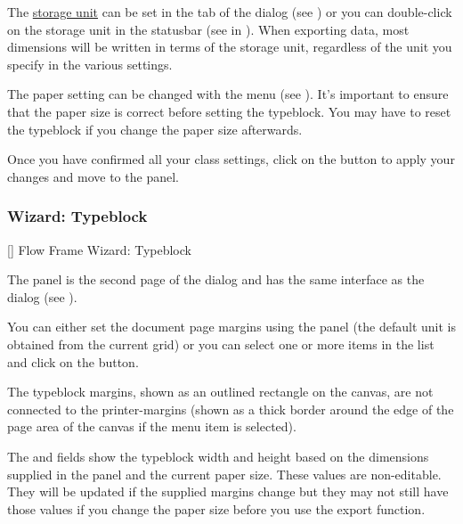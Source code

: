 The \hyperref[sec:controlsettings]{storage unit} can be set in the
 tab of the  dialog (see
) or you can double-click on the
storage unit in the \gls{statusbar} (see 
in ).  When exporting data, most dimensions
will be written in terms of the storage unit, regardless of the unit
you specify in the various settings.

The paper setting can be changed with the 
menu (see ). It's important to ensure that
the paper size is correct before setting the \gls{typeblock}.
You may have to reset the \gls{typeblock} if you change the paper
size afterwards.

Once you have confirmed all your class settings, click on the
 button to apply your changes and move to the
 panel.

\subsubsection{Wizard: Typeblock}\label{sec:flfwizardtypeblock}


[]
{}
{Flow Frame Wizard: Typeblock}

The  panel is the second page of the
 dialog and has the same interface as the
 dialog (see ).

You can either set the document page margins using the 
 panel (the default unit is
obtained from the current \gls{grid}) or you can select one or
more items in the  list
and click on the  button.

\begin{information}
The \gls{typeblock} margins, shown as an outlined 
rectangle on the \gls{canvas}, are not connected to the 
\glspl{printer-margin} (shown as a thick  border around
the edge of the page area of the \gls{canvas} if the
 menu item is selected).
\end{information}

The  and
 fields show the \gls{typeblock}
width and height based on the dimensions supplied in the
 panel and the current
paper size. These values are non-editable. They will be updated if the supplied
margins change but they may not still have those values if you
change the paper size before you use the export function.

